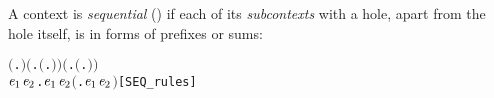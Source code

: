 A context is \emph{sequential} () if each of its \emph{subcontexts} with
a hole, apart from the hole itself, is in forms of prefixes or sums:
 \begin{alltt}
\HOLTokenTurnstile{}  \ensuremath{(}\HOLTokenLambda{}. \ensuremath{)} \HOLSymConst{\HOLTokenConj{}} \ensuremath{(}\HOLSymConst{\HOLTokenForall{}}.  \ensuremath{(}\HOLTokenLambda{}. \ensuremath{)}\ensuremath{)} \HOLSymConst{\HOLTokenConj{}} \ensuremath{(}\HOLSymConst{\HOLTokenForall{}} .   \HOLSymConst{\HOLTokenImp{}}  \ensuremath{(}\HOLTokenLambda{}. \HOLSymConst{\ensuremath{\ldotp}} \ensuremath{)}\ensuremath{)} \HOLSymConst{\HOLTokenConj{}}
   \HOLSymConst{\HOLTokenForall{}}\ensuremath{\HOLBoundVar{e}\sb{\mathrm{1}}} \ensuremath{\HOLBoundVar{e}\sb{\mathrm{2}}}.  \ensuremath{\HOLBoundVar{e}\sb{\mathrm{1}}} \HOLSymConst{\HOLTokenConj{}}  \ensuremath{\HOLBoundVar{e}\sb{\mathrm{2}}} \HOLSymConst{\HOLTokenImp{}}  \ensuremath{(}\HOLTokenLambda{}. \ensuremath{\HOLBoundVar{e}\sb{\mathrm{1}}}  \HOLSymConst{\ensuremath{+}} \ensuremath{\HOLBoundVar{e}\sb{\mathrm{2}}} \ensuremath{)}\hfill{[SEQ_rules]}
\end{alltt}

